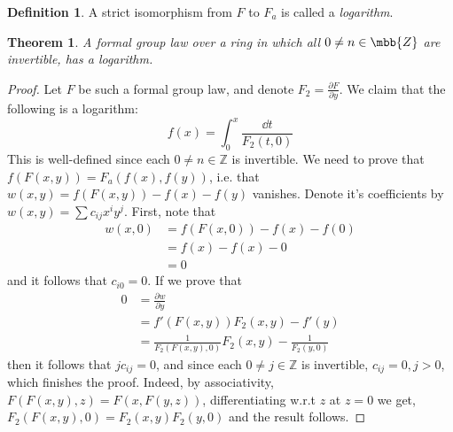\documentclass{article}
\newtheorem*{theorem*}{Theorem}
\theoremstyle{definition}
\newtheorem*{definition*}{Definition}
\theoremstyle{remark}
\begin{document}
	\begin{definition*}
		A strict isomorphism from $F$ to $F_a$ is called a \emph{logarithm}.
	\end{definition*}

	\begin{theorem*}
		A formal group law over a ring in which all $0 \neq n \in \mbb{Z}$ are invertible, has a logarithm.
	\end{theorem*}

	\begin{proof}
		Let $F$ be such a formal group law, and denote $F_2 = \frac{\partial F}{\partial y}$.
		We claim that the following is a logarithm:
		$$ f\left(x\right) = \int_0^x \frac{\dd{t}}{F_2\left(t,0\right)} $$
		This is well-defined since each $0 \neq n \in \mathbb{Z}$ is invertible.
		We need to prove that
		$f\left(F\left(x,y\right)\right) = F_a\left(f\left(x\right),f\left(y\right)\right)$,
		i.e. that
		$w\left(x,y\right) = f\left(F\left(x,y\right)\right) - f\left(x\right) - f\left(y\right)$ vanishes.
		Denote it's coefficients by $w\left(x,y\right) = \sum c_{ij} x^i y^j$.
		First, note that
		\begin{align*}
			w\left(x,0\right)
			&= f\left(F\left(x,0\right)\right) - f\left(x\right) - f\left(0\right)\\
			&= f\left(x\right) - f\left(x\right) - 0\\
			&= 0
		\end{align*}
		and it follows that $c_{i0} = 0$.
		If we prove that
		\begin{align*}
			0
			&= \frac{\partial w}{\partial y}\\
			&= f'\left(F\left(x,y\right)\right) F_2\left(x,y\right) - f'\left(y\right)\\
			&= \frac{1}{F_2\left(F\left(x,y\right),0\right)} F_2\left(x,y\right) - \frac{1}{F_2\left(y,0\right)}
		\end{align*}
		then it follows that $j c_{ij} = 0$, and since each $0 \neq j \in \mathbb{Z}$ is invertible, $c_{ij} = 0, j > 0$, which finishes the proof.
		Indeed, by associativity,
		$F\left(F\left(x,y\right),z\right)=F\left(x,F\left(y,z\right)\right)$, differentiating w.r.t $z$ at $z=0$ we get,
		$
			F_2\left(F\left(x,y\right),0\right)
			= F_2\left(x,y\right) F_2\left(y,0\right)
		$
		and the result follows.
	\end{proof}
\end{document}
